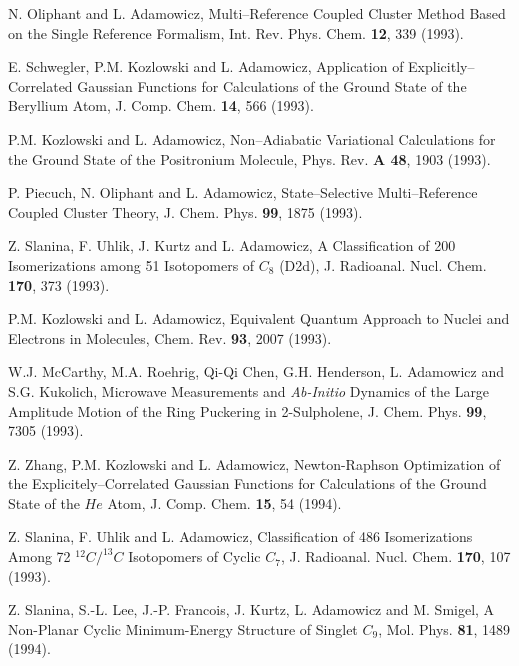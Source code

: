\pagebreak


\begin{thebibliography}{999}


N. Oliphant and L. Adamowicz, Multi--Reference Coupled Cluster 
Method Based on the Single
Reference Formalism, Int. Rev. Phys. Chem. {\bf 12}, 339 (1993).

E. Schwegler, P.M. Kozlowski and L. Adamowicz, 
Application of Explicitly--Correlated Gaussian
Functions for Calculations of the 
Ground State of the Beryllium Atom, J. Comp. Chem. {\bf 14}, 566 (1993).

P.M. Kozlowski and L. Adamowicz, Non--Adiabatic 
Variational Calculations for the Ground State of
the Positronium Molecule, Phys. Rev. {\bf A 48}, 1903 (1993).

   P. Piecuch, N. Oliphant and L. Adamowicz, 
State--Selective Multi--Reference Coupled Cluster Theory,
J. Chem. Phys. {\bf 99}, 1875 (1993).

   Z. Slanina, F. Uhlik, J. Kurtz and L. Adamowicz, 
A Classification of 200 Isomerizations among 51
Isotopomers of $C_8$ (D2d), J. Radioanal. Nucl. Chem. {\bf 170}, 
373 (1993).

P.M. Kozlowski and L. Adamowicz, Equivalent 
Quantum Approach to Nuclei and Electrons in
Molecules, Chem. Rev. {\bf 93}, 2007 (1993).

   W.J. McCarthy, M.A. Roehrig, Qi-Qi Chen, 
G.H. Henderson, L. Adamowicz and S.G. Kukolich,
Microwave Measurements and {\it Ab-Initio} Dynamics of the Large 
Amplitude Motion of the Ring
Puckering in 2-Sulpholene, J. Chem. Phys. {\bf 99}, 7305 (1993).

Z. Zhang, P.M. Kozlowski and L. Adamowicz, Newton-Raphson 
Optimization of the Explicitely--Correlated 
Gaussian Functions for Calculations of 
the Ground State of the $He$ Atom, J. Comp. Chem.
{\bf 15}, 54 (1994).

Z. Slanina, F. Uhlik and L. Adamowicz, 
Classification of 486 Isomerizations Among 72 $^{12}C/^{13}C$
Isotopomers of Cyclic $C_7$, J. Radioanal. 
Nucl. Chem. {\bf 170}, 107 (1993).

Z. Slanina, S.-L. Lee, J.-P. Francois, J. Kurtz, L. Adamowicz 
and  M. Smigel, A Non-Planar Cyclic
Minimum-Energy Structure of Singlet $C_9$, 
Mol. Phys. {\bf 81}, 1489 (1994).


\end{thebibliography}
